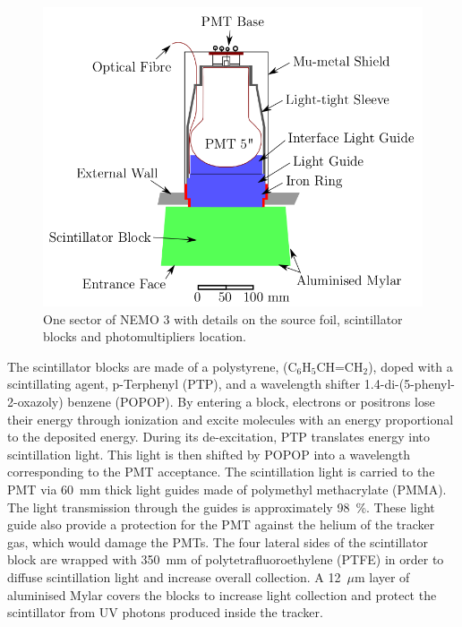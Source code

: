 \documentclass[main.tex]{subfiles}
\begin{document}
\begin{figure}[h!]
\begin{center}
\includegraphics[scale=0.40]{pictures/Chap3/CaloModuleNEMO3.png}
\caption{One sector of NEMO 3 with details on the source foil, scintillator blocks and photomultipliers location.}
\label{CaloModuleNEMO3}
\end{center}
\end{figure}


\NI The scintillator blocks are made of a polystyrene, (C$_\text{6}$H$_\text{5}$CH=CH$_\text{2}$), doped with a scintillating agent, p-Terphenyl (PTP), and a wavelength shifter 1.4-di-(5-phenyl-2-oxazoly) benzene (POPOP). By entering a block, electrons or positrons lose their energy through ionization and excite molecules with an energy proportional to the deposited energy. During its de-excitation, PTP translates energy into scintillation light. This light is then shifted by POPOP into a wavelength corresponding to the PMT acceptance. The scintillation light is carried to the PMT via 60~mm thick light guides made of polymethyl methacrylate (PMMA). The light transmission through the guides is approximately 98~\%. These light guide also provide a protection for the PMT against the helium of the tracker gas, which would damage the PMTs. The four lateral sides of the scintillator block are wrapped with 350~mm of polytetrafluoroethylene (PTFE) in order to diffuse scintillation light and increase overall collection. A 12~$\mu$m layer of aluminised Mylar covers the blocks to increase light collection and protect the scintillator from UV photons produced inside the tracker.
\end{document}

